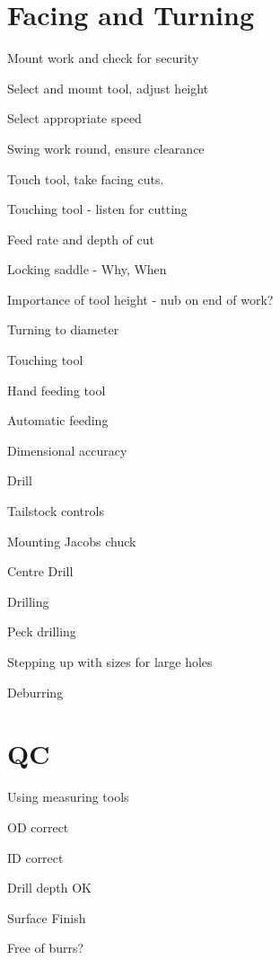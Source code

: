 \documentclass[11pt,a4paper,twoside,openany]{book}
\newenvironment{checklist}{
  \begin{list}{}{}
  
}{%
  \end{list}
}
\begin{document}
\chapter{Facing and Turning}
	\begin{checklist}
	\item Mount work and check for security
	\item Select and mount tool, adjust height
	\item Select appropriate speed
	\item Swing work round, ensure clearance
	\item Touch tool, take facing cuts.
		\begin{checklist}
		\item Touching tool - listen for cutting
		\item Feed rate and depth of cut
		\item Locking saddle - Why, When
		\item Importance of tool height - nub on end of work?
		\end{checklist}
	\item Turning to diameter
		\begin{checklist}
		\item Touching tool
		\item Hand feeding tool
		\item Automatic feeding
		\item Dimensional accuracy
		\end{checklist}
	\item Drill
		\begin{checklist}
		\item Tailstock controls
		\item Mounting Jacobs chuck
		\item Centre Drill
		\item Drilling
			\begin{checklist}
			\item Peck drilling
			\item Stepping up with sizes for large holes
			\end{checklist}
		\item Deburring
		\end{checklist}
	\end{checklist}
\chapter {QC}
	\begin{checklist}
	\item Using measuring tools
	\item OD correct
	\item ID correct
	\item Drill depth OK
	\item Surface Finish
	\item Free of burrs?
	\end{checklist}
\end{document}
